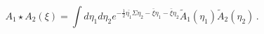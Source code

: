 \begin{equation}
A_{1}\star A_{2}(\xi )=\int d\eta _{1}d\eta _{2}e^{-{\frac{1}{2}}\bar{\eta
_{1}}\Sigma \eta _{2}-\bar{\xi}\eta _{1}-\bar{\xi}\eta _{2}}\tilde{A}%
_{1}(\eta _{1})\tilde{A}_{2}(\eta _{2})\,.
\end{equation}

